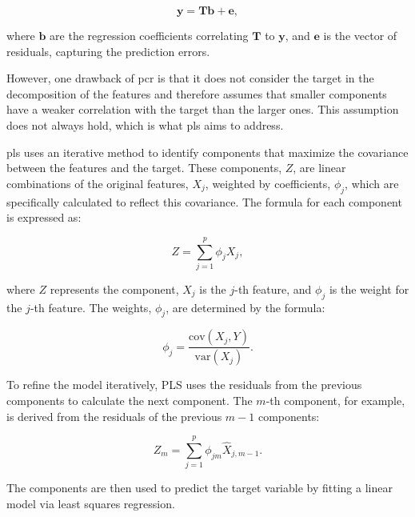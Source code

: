 $$
\mathbf{y} = \mathbf{Tb} + \mathbf{e},
$$

where $\mathbf{b}$ are the regression coefficients correlating $\mathbf{T}$ to $\mathbf{y}$, and $\mathbf{e}$ is the vector of residuals, capturing the prediction errors.

However, one drawback of \gls{pcr} is that it does not consider the target in the decomposition of the features and therefore assumes that smaller components have a weaker correlation with the target than the larger ones.
This assumption does not always hold, which is what \gls{pls} aims to address.

\gls{pls} uses an iterative method to identify components that maximize the covariance between the features and the target.
These components, $Z$, are linear combinations of the original features, $X_j$, weighted by coefficients, $\phi_j$, which are specifically calculated to reflect this covariance.
The formula for each component is expressed as:

$$
    Z = \sum_{j=1}^{p} \phi_j X_j,
$$

where $Z$ represents the component, $X_j$ is the $j$-th feature, and $\phi_j$ is the weight for the $j$-th feature.
The weights, $\phi_j$, are determined by the formula:

$$
    \phi_j = \frac{\text{cov}(X_j, Y)}{\text{var}(X_j)}.
$$

To refine the model iteratively, PLS uses the residuals from the previous components to calculate the next component.
The $m$-th component, for example, is derived from the residuals of the previous $m-1$ components:

$$
    Z_m = \sum_{j=1}^{p} \phi_{jm} \hat{X}_{j, m-1}.
$$

The components are then used to predict the target variable by fitting a linear model via least squares regression.
